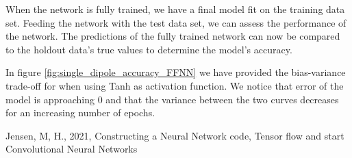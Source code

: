 \documentclass[a4paper, UKenglish, 11pt]{uiomaster}
\begin{document}
When the network is fully trained, we have a final model fit on the training data set. Feeding the network with the test data set, we can assess the performance of the network. The predictions of the fully trained network can now be compared to the holdout data's true values to determine the model's accuracy.

In figure \ref{fig:single_dipole_accuracy_FFNN} we have provided the bias-variance trade-off for when using Tanh as activation function. We notice that error of the model is approaching 0 and that the variance between the two curves decreases for an increasing number of epochs.



\begin{thebibliography}{9}

     Jensen, M, H., 2021, Constructing a Neural Network code, Tensor flow and start Convolutional Neural Networks

\end{thebibliography}
\end{document}
